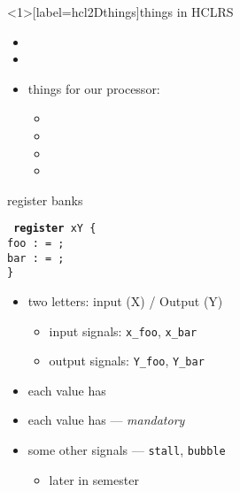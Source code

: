 \begin{frame}<1>[label=hcl2Dthings]{things in HCLRS}
    \begin{itemize}
    \item {}
    \item {}
    \item things for our processor:
        \begin{itemize}
        \item {}
        \item {}
        \item {}
        \item {}
        \end{itemize}
    \end{itemize}
\end{frame}


\begin{frame}[fragile,label=regBanks]{register banks}
\newcommand{\inColor}{\color{green!60!black}}
\newcommand{\outColor}{\color{blue!80!black}}

{\tt\small
\textbf{register} {\inColor x}{\outColor Y} \{ \\
\hspace{.5cm} foo :  = ; \\
\hspace{.5cm} bar :  = ; \\ 
\}
}
    \begin{itemize}
    \item two letters: input ({\inColor X}) / Output ({\outColor Y})
        \begin{itemize}
        \item input signals: {\tt\inColor x\_foo}, {\tt\inColor x\_bar}
        \item output signals: {\tt\outColor Y\_foo}, {\tt\outColor Y\_bar}
        \end{itemize}
    \item each value has 
    \item each value has  --- \textit{mandatory}
    \item some other signals --- {\tt stall}, {\tt bubble}
        \begin{itemize}
        \item later in semester
        \end{itemize}
    \end{itemize}
\end{frame}

